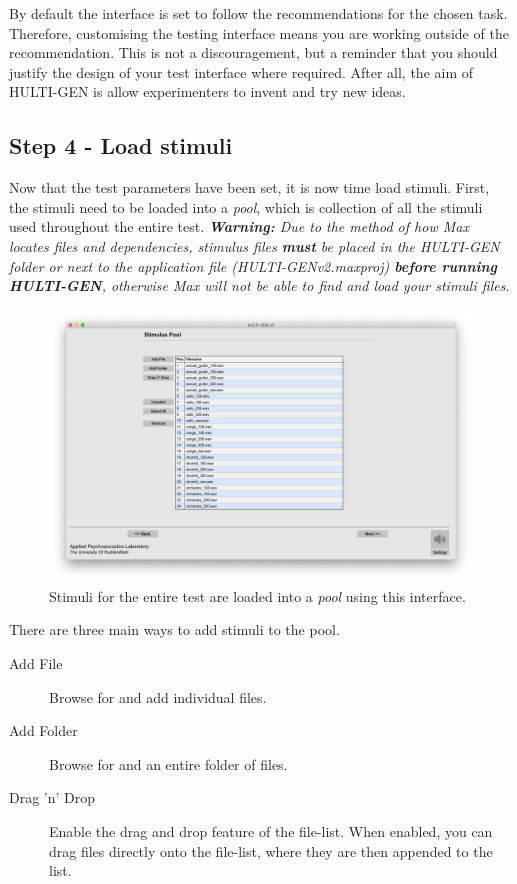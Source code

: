 \noindent
By default the interface is set to follow the recommendations for the chosen task. Therefore, customising the testing interface means you are working outside of the recommendation. This is not a discouragement, but a reminder that you should justify the design of your test interface where required. After all, the aim of HULTI-GEN is allow experimenters to invent and try new ideas.

\subsection{Step 4 - Load stimuli}
Now that the test parameters have been set, it is now time load stimuli. First, the stimuli need to be loaded into a \emph{pool}, which is collection of all the stimuli used throughout the entire test.
\newline\newline
\textit{\textbf{Warning:} Due to the method of how Max locates files and dependencies, stimulus files \textbf{must} be placed in the HULTI-GEN folder or next to the application file (HULTI-GENv2.maxproj) \textbf{before running HULTI-GEN}, otherwise Max will not be able to find and load your stimuli files}.

\begin{figure}[ht]
	\centering
	\includegraphics[width=1.0\textwidth]{./images/createTest_step05_stimulusPool.png}
	\caption{Stimuli for the entire test are loaded into a \emph{pool} using this interface.}
	\label{create::stimulusPool}
\end{figure}

\noindent
There are three main ways to add stimuli to the pool.
\begin{description}
	\item[Add File] Browse for and add individual files.
	\item[Add Folder] Browse for and an entire folder of files.
	\item[Drag 'n' Drop] Enable the drag and drop feature of the file-list. When enabled, you can drag files directly onto the file-list, where they are then appended to the list.
\end{description}

